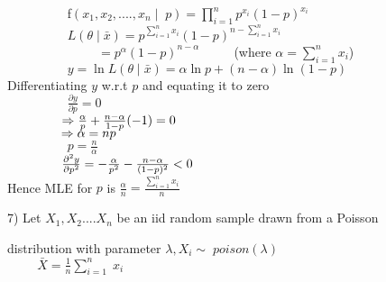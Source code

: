 \documentclass[]{article}
\begin{document}
$\hspace{2cm}$f$(x_1,x_2,....,x_n\mid\;p)= \prod_{i=1}^{n}p^{x_i}(1-p)^{x_{i}}$\\

$\hspace{2cm} L(\theta\mid\bar{x})= p^{\sum_{i=1}^{n}x_{i}} (1-p)^{n-\sum_{i=1}^{n}x_{i}}$\\

$\hspace{3cm} = p^{\alpha}(1-p)^{n-\alpha}$ $\hspace{1cm}$(where $\alpha = \sum_{i=1}^{n}x_{i}$)\\

$\hspace{2cm}y= \ln L(\theta\mid\bar{x}) = \alpha\ln p + (n-\alpha)\ln(1-p)$\\

Differentiating $y$ w.r.t $p$ and equating it to zero\\

$\hspace{2cm} \frac{\partial y}{\partial p} = 0$\\

$\hspace{1.5cm}\Rightarrow \frac{\alpha}{p} + \frac{n-\alpha}{1-p}(-1)=0$\\

$\hspace{1.5cm} \Rightarrow \alpha = np$\\

$\hspace{2cm}  p = \frac{n}{\alpha}$\\

$\hspace{1.5cm} \frac{\partial^{2}y}{\partial p^{2}} = -\frac{\alpha}{p^{2}} - \frac{n-\alpha}{(1-p)^{2}}<0$ \\

Hence MLE for $p$ is $\frac{\alpha}{n}=\frac{\sum_{i=1}^{n}x_{i}}{n}$



\begin{flushleft}
7) Let $X_1,X_2....X_n$ be an iid random sample drawn from a Poisson 
\end{flushleft}

distribution with parameter $\lambda, X_{i}\sim\;poison(\lambda)$\\

$\hspace{1cm}\bar X=\frac{1}{n}\sum_{i=1}^{n} \;x_{i}$\\
\end{document}
